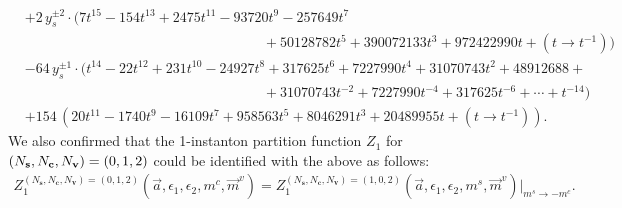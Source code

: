 \documentclass[letterpaper, 11pt]{article}
\newcommand{\nn}{\nonumber}
\def\e{\epsilon}
\begin{document}
{\begin{align}
  &+2\,y_s^{\pm2}\cdot (7 t^{15}-154 t^{13}+2475 t^{11}-93720 t^9-257649 t^7 \nn\\
  &\qquad\qquad\qquad\qquad\qquad\qquad\qquad\qquad\quad +50128782 t^5+390072133 t^3+972422990t+ (t\rightarrow t^{-1}))\nn\\
  &-64\,y_s^{\pm1}\cdot (t^{14}-22 t^{12}+231 t^{10}-24927 t^8+317625 t^6+7227990 t^4+31070743t^2+48912688+ \nn\\
  &\qquad\qquad\qquad\qquad\qquad\qquad\qquad\qquad\quad +31070743t^{-2}+7227990 t^{-4}+317625 t^{-6}+ \cdots + t^{-14})\nn\\
  &+154\,(20 t^{11}-1740 t^9-16109 t^7+958563 t^5+8046291 t^3+20489955
  t+ (t\rightarrow t^{-1})).
  \end{align}
  We also confirmed that the 1-instanton partition function $Z_1$ for $(N_{\bf s},N_{\bf c}, N_{\bf v}) = (0,1,2)$ could be identified with the above as follows:
  \begin{align}
    {Z}_{1}^{(N_{\mathbf{s}},N_\mathbf{c},N_{\mathbf{v}}) = (0,1,2)}(\vec{a},\e_1,\e_2,m^c,\vec{m}^v)  = {Z}_{1}^{(N_{\mathbf{s}},N_\mathbf{c},N_{\mathbf{v}}) = (1,0,2)}(\vec{a},\e_1,\e_2,m^s,\vec{m}^v) |_{m^s \rightarrow -m^c }.
  \end{align}
  

}
\end{document}

